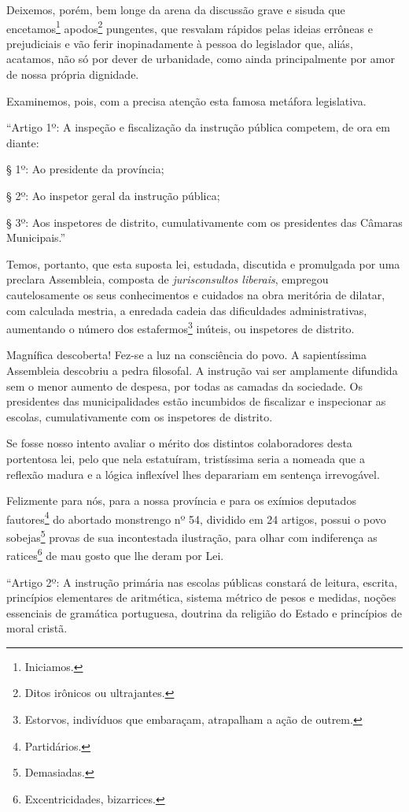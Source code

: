 Deixemos, porém, bem longe da arena da discussão grave e sisuda que
encetamos\footnote{Iniciamos.} apodos\footnote{Ditos irônicos ou
  ultrajantes.} pungentes, que resvalam rápidos pelas ideias errôneas e
prejudiciais e vão ferir inopinadamente à pessoa do legislador que,
aliás, acatamos, não só por dever de urbanidade, como ainda
principalmente por amor de nossa própria dignidade.

Examinemos, pois, com a precisa atenção esta famosa metáfora
legislativa.

``Artigo 1º: A inspeção e fiscalização da instrução pública competem, de
ora em diante:

§ 1º: Ao presidente da província;

§ 2º: Ao inspetor geral da instrução pública;

§ 3º: Aos inspetores de distrito, cumulativamente com os presidentes das
Câmaras Municipais.''

Temos, portanto, que esta suposta lei, estudada, discutida e promulgada
por uma preclara Assembleia, composta de \emph{jurisconsultos liberais},
empregou cautelosamente os seus conhecimentos e cuidados na obra
meritória de dilatar, com calculada mestria, a enredada cadeia das
dificuldades administrativas, aumentando o número dos
estafermos\footnote{Estorvos, indivíduos que embaraçam, atrapalham a
  ação de outrem.} inúteis, ou inspetores de distrito.

Magnífica descoberta! Fez-se a luz na consciência do povo. A
sapientíssima Assembleia descobriu a pedra filosofal. A instrução vai
ser amplamente difundida sem o menor aumento de despesa, por todas as
camadas da sociedade. Os presidentes das municipalidades estão
incumbidos de fiscalizar e inspecionar as escolas, cumulativamente com
os inspetores de distrito.

Se fosse nosso intento avaliar o mérito dos distintos colaboradores
desta portentosa lei, pelo que nela estatuíram, tristíssima seria a
nomeada que a reflexão madura e a lógica inflexível lhes deparariam em
sentença irrevogável.

Felizmente para nós, para a nossa província e para os exímios deputados
fautores\footnote{Partidários.} do abortado monstrengo nº 54, dividido
em 24 artigos, possui o povo sobejas\footnote{Demasiadas.} provas de
sua incontestada ilustração, para olhar com indiferença as
ratices\footnote{Excentricidades, bizarrices.} de mau gosto que lhe
deram por Lei.

``Artigo 2º: A instrução primária nas escolas públicas constará de
leitura, escrita, princípios elementares de aritmética, sistema métrico
de pesos e medidas, noções essenciais de gramática portuguesa, doutrina
da religião do Estado e princípios de moral cristã.


